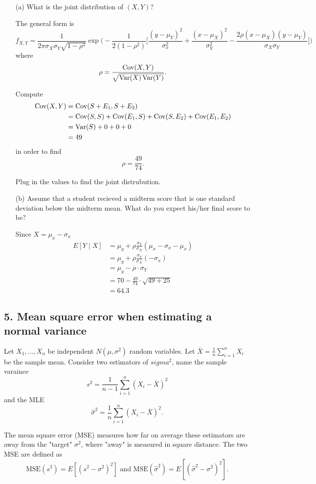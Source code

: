 \documentclass{tufte-book}
\begin{document}
\begin{enumerate}
\item[(a)] What is the joint distribution of $(X,Y)$?

The general form is 
\[ f_{X,Y} = \frac{1}{2\pi\sigma_X\sigma_Y\sqrt{1-\rho^2}} \exp\big(-\frac{1}{2(1-\rho^2)}\big[ \frac{(y-\mu_Y)^2}{\sigma_x^2}+\frac{(x-\mu_X)^2}{\sigma_Y^2} - \frac{2\rho(x-\mu_X)(y-\mu_Y)}{\sigma_X\sigma_Y} \big]\big) \]
where
\[ \rho=\frac{\operatorname{Cov}(X,Y)}{\sqrt{\operatorname{Var}(X)\operatorname{Var}(Y)}}. \]

Compute
\begin{align*}
\operatorname{Cov}(X,Y) &= \operatorname{Cov}(S+E_1,S+E_2)\\
&=\operatorname{Cov}(S,S) + \operatorname{Cov}(E_1,S) + \operatorname{Cov}(S,E_2) + \operatorname{Cov}(E_1,E_2)\\
&= \operatorname{Var}(S) + 0 + 0 + 0\\
&= 49
\end{align*}
in order to find
\[ \rho=\frac{49}{74}. \]

Plug in the values to find the joint distrubution.

\item[(b)]Assume that a student recieved a midterm score that is one standard deviation below the midterm mean.  What do you expect his/her final score to be?

Since $X=\mu_x - \sigma_x$
\begin{align*}
E[Y\mid X] &= \mu_y + \rho \frac{\sigma_Y}{\sigma_X}(\mu_x - \sigma_x - \mu_x)\\
&= \mu_y + \rho \frac{\sigma_Y}{\sigma_X}(- \sigma_x)\\
&= \mu_y - \rho \cdot \sigma_Y\\
&= 70 - \frac{49}{74} \cdot \sqrt{49+25}\\
&= 64.3
\end{align*}

\end{enumerate}

\subsection{5. Mean square error when estimating a normal variance}
Let $X_1,...,X_n$ be independent $N(\mu,\sigma^2)$ random variables.  Let $\overline{X}=\frac{1}{n}\sum_{i=1}^nX_i$ be the sample mean.  Consider two estimators of $sigma^2$, name the sample varaince
\[ s^2 = \frac{1}{n-1}\sum_{i=1}^n(X_i-\overline{X})^2 \]
and the MLE
\[ \hat{\sigma}^2 = \frac{1}{n}\sum_{i=1}^n(X_i-\overline{X})^2.\]

The mean square error (MSE) measures how far on average these estimators are away from the "target" $\sigma^2$, where "away" is measured in square distance.  The two MSE are defined as
\[ \text{MSE}(s^2) = E[(s^2-\sigma^2)^2] \text{ and MSE}(\hat{\sigma}^2)= E[(\hat{\sigma}^2 - \sigma^2)^2].\]
\end{document}
